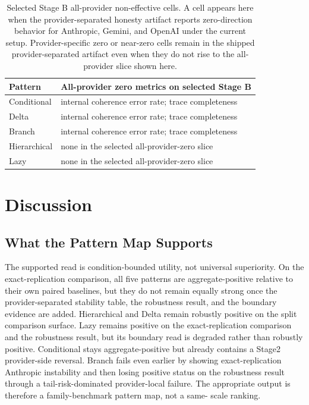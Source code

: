 \documentclass[11pt,a4paper]{article}
\begin{document}
\begin{table}[t]
\centering
\small
\begin{tabular}{L{2.4cm}L{8.8cm}}
\toprule
\textbf{Pattern} & \textbf{All-provider zero metrics on selected Stage B} \\
\midrule
Conditional & internal coherence error rate; trace completeness \\
Delta & internal coherence error rate; trace completeness \\
Branch & internal coherence error rate; trace completeness \\
Hierarchical & none in the selected all-provider-zero slice \\
Lazy & none in the selected all-provider-zero slice \\
\bottomrule
\end{tabular}
\caption{Selected Stage B all-provider non-effective cells. A cell appears here when the provider-separated honesty artifact reports zero-direction behavior for Anthropic, Gemini, and OpenAI under the current setup. Provider-specific zero or near-zero cells remain in the shipped provider-separated artifact even when they do not rise to the all-provider slice shown here.}
\label{tab:stageb_noneffective_nrr_patterns}
\end{table}

\section{Discussion}
\label{sec:discussion}

\subsection{What the Pattern Map Supports}

The supported read is condition-bounded utility, not universal superiority. On
the exact-replication comparison, all five patterns are aggregate-positive
relative to their own paired baselines, but they do not remain equally strong
once the provider-separated stability table, the robustness result, and the
boundary evidence are added. Hierarchical and Delta remain robustly positive on
the split comparison surface. Lazy remains positive on the exact-replication
comparison and the robustness result, but its boundary read is degraded rather
than robustly positive. Conditional stays aggregate-positive but already
contains a Stage2 provider-side reversal. Branch fails even earlier by showing
exact-replication Anthropic instability and then losing positive status on the
robustness result through a tail-risk-dominated provider-local failure. The
appropriate output is therefore a family-benchmark pattern map, not a same-
scale ranking.
\end{document}
